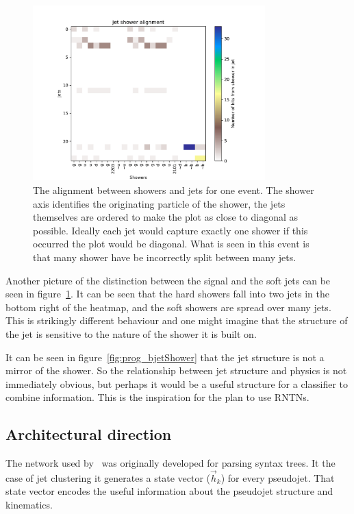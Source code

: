 \begin{figure}
    \centering
    \includegraphics[width=0.8\textwidth]{images/prog_showerJetAlignment.pdf}
    \caption{The alignment between showers and jets for one event.
        The shower axis identifies the originating particle of the shower,
        the jets themselves are ordered to make the plot as close to diagonal as possible.
        Ideally each jet would capture exactly one shower
    if this occurred the plot would be diagonal.
             What is seen in this event is that many shower have be incorrectly split between many jets.}
    \label{fig:prog_showerJetAlignment}
\end{figure}

Another picture of the distinction between the signal and the soft jets can be seen in figure~\ref{fig:prog_showerJetAlignment}.
It can be seen that the hard showers fall into two jets in the bottom right of the heatmap,
and the soft showers are spread over many jets. 
This is strikingly different behaviour and one might imagine that the structure of the jet is sensitive to the nature of the shower it is built on.

It can be seen in figure~\ref{fig:prog_bjetShower} that the jet structure is not a mirror of the shower.
So the relationship between jet structure and physics is not immediately obvious, but perhaps it would be a useful structure for a classifier to combine information.
This is the inspiration for the plan to use RNTNs.


\subsection{Architectural direction}
The network used by~\cite{cheng_recursive_2018} was originally developed for parsing syntax trees.
It the case of jet clustering it generates a state vector (\(\vec{h}_k\)) for every pseudojet.
That state vector encodes the useful information about the pseudojet structure and kinematics.

